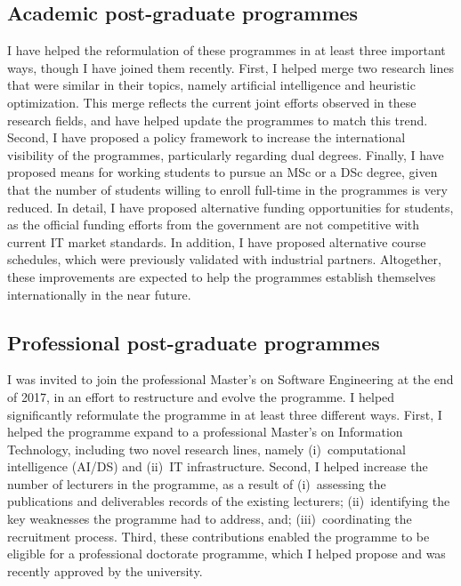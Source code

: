 \subsection{Academic post-graduate programmes}
%
{I have helped the reformulation of these programmes in at least three important ways, though I have joined them recently. First, I helped merge two research lines that were similar in their topics, namely artificial intelligence and heuristic optimization. This merge reflects the current joint efforts observed in these research fields, and have helped update the programmes to match this trend. Second, I have proposed a policy framework to increase the international visibility of the programmes, particularly regarding dual degrees. Finally, I have proposed means for working students to pursue an MSc or a DSc degree, given that the number of students willing to enroll full-time in the programmes is very reduced. In detail, I have proposed alternative funding opportunities for students, as the official funding efforts from the government are not competitive with current IT market standards. In addition, I have proposed alternative course schedules, which were previously validated with industrial partners. Altogether, these improvements are expected to help the programmes establish themselves internationally in the near future.}

\subsection{Professional post-graduate programmes}
%
{I was invited to join the professional Master's on Software Engineering at the end of 2017, in an effort to restructure and evolve the programme. I helped significantly reformulate the programme in at least three different ways. First, I helped the programme expand to a professional Master's on Information Technology, including two novel research lines, namely (i)~computational intelligence (AI/DS) and (ii)~IT infrastructure. Second, I helped increase the number of lecturers in the programme, as a result of (i)~assessing the publications and deliverables records of the existing lecturers; (ii)~identifying the key weaknesses the programme had to address, and; (iii)~coordinating the recruitment process. Third, these contributions enabled the programme to be eligible for a professional doctorate programme, which I helped propose and was recently approved by the university.}

